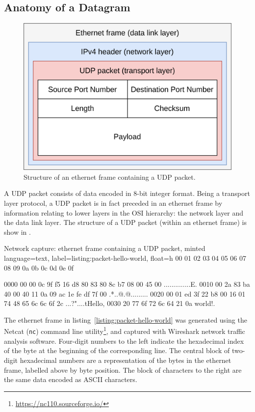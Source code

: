 \subsection{Anatomy of a Datagram}\label{subsec:anatomy-of-a-datagram}

\begin{figure}[h]
    \centering
    \includegraphics[width=.5\textwidth]{figures/udp}
    \caption{Structure of an ethernet frame containing a UDP packet.}
    \label{fig:udp-frame}
\end{figure}

A UDP packet consists of data encoded in 8-bit integer format.
Being a transport layer protocol, a UDP packet is in fact preceded in an
ethernet frame by information relating to lower layers in the OSI hierarchy: the
network layer and the data link layer.
The structure of a UDP packet (within an ethernet frame) is show in
.

\begin{codelisting}{Network capture: ethernet frame containing a UDP packet,
    minted language=text,
    label=listing:packet-hello-world,
    float=h}
           00 01 02 03 04 05 06 07  08 09 0a 0b 0c 0d 0e 0f

    0000   00 00 0c 9f f5 16 d8 80  83 80 8c b7 08 00 45 00   ..............E.
    0010   00 2a 83 ba 40 00 40 11  0a 09 ac 1e fe df 7f 00   .*..@.@.........
    0020   00 01 ed 3f 22 b8 00 16  01 74 48 65 6c 6c 6f 2c   ...?"....tHello,
    0030   20 77 6f 72 6c 64 21 0a                             world!.

\end{codelisting}
\noindent
The ethernet frame in listing~\ref{listing:packet-hello-world} was generated
using the Netcat (\texttt{nc}) command line utility\footnote{
    \url{https://nc110.sourceforge.io/}
}, and captured with Wireshark network traffic analysis software.
Four-digit numbers to the left indicate the hexadecimal index of the byte
at the beginning of the corresponding line.
The central block of two-digit hexadecimal numbers are a representation of the
bytes in the ethernet frame, labelled above by byte position.
The block of characters to the right are the same data encoded as ASCII
characters.

